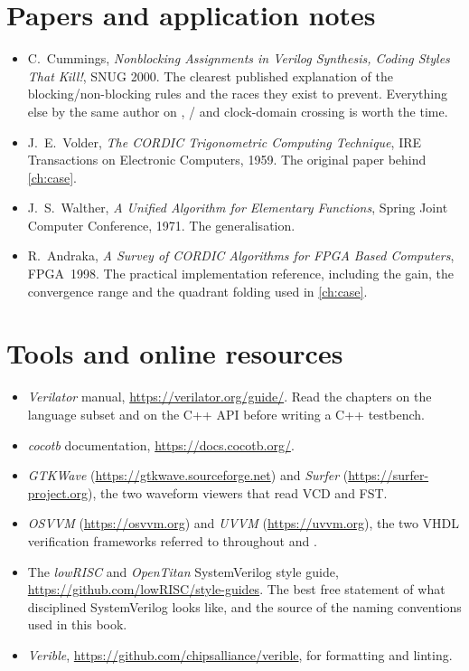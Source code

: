 \section*{Papers and application notes}

\begin{itemize}
  \item C.~Cummings, \emph{Nonblocking Assignments in Verilog Synthesis, Coding
        Styles That Kill!}, SNUG 2000. The clearest published explanation of
        the blocking/non-blocking rules and the races they exist to prevent.
        Everything else by the same author on ,
        / and clock-domain crossing is worth the
        time.
  \item J.~E.~Volder, \emph{The CORDIC Trigonometric Computing Technique},
        IRE Transactions on Electronic Computers, 1959. The original paper
        behind \cref{ch:case}.
  \item J.~S.~Walther, \emph{A Unified Algorithm for Elementary Functions},
        Spring Joint Computer Conference, 1971. The generalisation.
  \item R.~Andraka, \emph{A Survey of CORDIC Algorithms for FPGA Based
        Computers}, FPGA~1998. The practical implementation reference,
        including the gain, the convergence range and the quadrant folding
        used in \cref{ch:case}.
\end{itemize}

\section*{Tools and online resources}

\begin{itemize}
  \item \emph{Verilator} manual, \url{https://verilator.org/guide/}. Read the
        chapters on the language subset and on the C++ API before writing a
        C++ testbench.
  \item \emph{cocotb} documentation, \url{https://docs.cocotb.org/}.
  \item \emph{GTKWave} (\url{https://gtkwave.sourceforge.net}) and
        \emph{Surfer} (\url{https://surfer-project.org}), the two waveform
        viewers that read VCD and FST.
  \item \emph{OSVVM} (\url{https://osvvm.org}) and \emph{UVVM}
        (\url{https://uvvm.org}), the two VHDL verification frameworks
        referred to throughout  and .
  \item The \emph{lowRISC} and \emph{OpenTitan} SystemVerilog style guide,
        \url{https://github.com/lowRISC/style-guides}. The best free
        statement of what disciplined SystemVerilog looks like, and the
        source of the naming conventions used in this book.
  \item \emph{Verible}, \url{https://github.com/chipsalliance/verible}, for
        formatting and linting.
\end{itemize}
